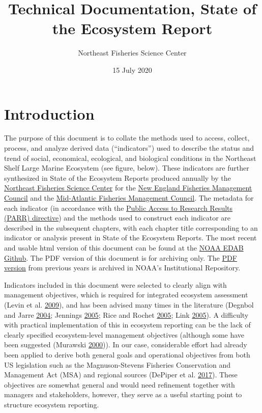 \documentclass[
]{book}
\title{Technical Documentation, State of the Ecosystem Report}
\author{Northeast Fisheries Science Center}
\date{15 July 2020}
\begin{document}
\maketitle

{
\setcounter{tocdepth}{1}
\tableofcontents
}
\hypertarget{introduction}{%
\chapter*{Introduction}\label{introduction}}

The purpose of this document is to collate the methods used to access, collect, process, and analyze derived data (``indicators'') used to describe the status and trend of social, economical, ecological, and biological conditions in the Northeast Shelf Large Marine Ecosystem (see figure, below). These indicators are further synthesized in State of the Ecosystem Reports produced annually by the \href{https://www.nefsc.noaa.gov/}{Northeast Fisheries Science Center} for the \href{https://www.nefmc.org/}{New England Fisheries Management Council} and the \href{http://www.mafmc.org/}{Mid-Atlantic Fisheries Management Council}. The metadata for each indicator (in accordance with the \href{http://obamawhitehouse.archives.gov/sites/default/files/microsites/ostp/ostp_public_access_memo_2013.pdf}{Public Access to Research Results (PARR) directive}) and the methods used to construct each indicator are described in the subsequent chapters, with each chapter title corresponding to an indicator or analysis present in State of the Ecosystem Reports. The most recent and usable html version of this document can be found at the \href{https://noaa-edab.github.io/tech-doc/}{NOAA EDAB Github}. The PDF version of this document is for archiving only. The \href{https://doi.org/10.25923/64pf-sc70}{PDF version} from previous years is archived in NOAA's Institutional Repository.

Indicators included in this document were selected to clearly align with management objectives, which is required for integrated ecosystem assessment (Levin et al. \protect\hyperlink{ref-levin_integrated_2009}{2009}), and has been advised many times in the literature (Degnbol and Jarre \protect\hyperlink{ref-degnbol_review_2004}{2004}; Jennings \protect\hyperlink{ref-jennings_indicators_2005}{2005}; Rice and Rochet \protect\hyperlink{ref-rice_framework_2005}{2005}; Link \protect\hyperlink{ref-link_translating_2005}{2005}). A difficulty with practical implementation of this in ecosystem reporting can be the lack of clearly specified ecosystem-level management objectives (although some have been suggested (Murawski \protect\hyperlink{ref-murawski_definitions_2000}{2000})). In our case, considerable effort had already been applied to derive both general goals and operational objectives from both US legislation such as the Magnuson-Stevens Fisheries Conservation and Management Act (MSA) and regional sources (DePiper et al. \protect\hyperlink{ref-depiper_operationalizing_2017}{2017}). These objectives are somewhat general and would need refinement together with managers and stakeholders, however, they serve as a useful starting point to structure ecosystem reporting.
\end{document}
